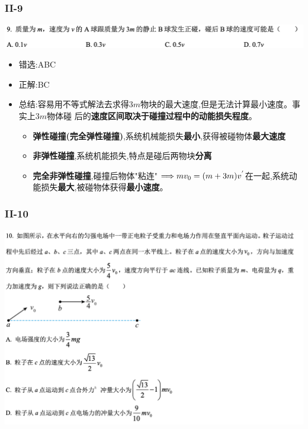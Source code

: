\documentclass{article}
\begin{document}
    \subsubsection{II-9}
    \includegraphics[width=50em,keepaspectratio]{./pictures/1.1-2.png}

    \begin{itemize}
        \item 错选:\quad ABC
        \item 正解:\quad BC    
        \item 总结:\quad 容易用不等式解法去求得$3m$物块的最大速度,但是无法计算最小速度。事实上$3m$物体碰
        后的\textbf{速度区间取决于碰撞过程中的动能损失程度}。
        \begin{itemize}
            \item \textbf{弹性碰撞(完全弹性碰撞)},系统机械能损失\textbf{最小},获得被碰物体\textbf{最大速度}
            \item \textbf{非弹性碰撞},系统机能损失,特点是碰后两物块\textbf{分离}
            \item \textbf{完全非弹性碰撞},碰撞后物体"粘连"  $ \Longrightarrow mv_{0} = (m+3m)v^{'} $在一起,系统动能损失\textbf{最大},被碰物体获得\textbf{最小速度}。
        \end{itemize}
    \end{itemize}

    \subsubsection{II-10}
    \includegraphics[width=50em,keepaspectratio]{./pictures/1.1-3.png}
\end{document}
